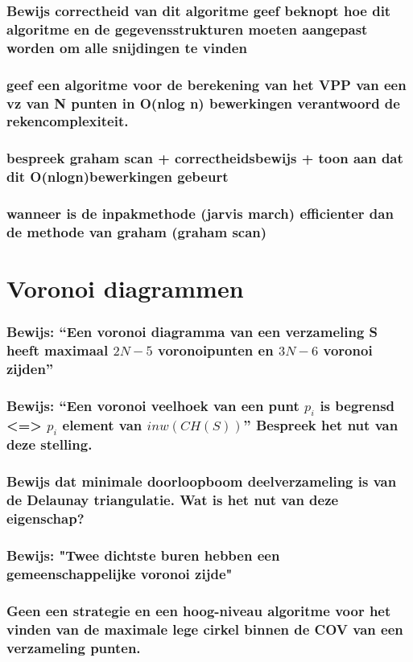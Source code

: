 \documentclass[12pt,a4paper]{article}
\begin{document}
\section{Bewijs correctheid van dit algoritme geef beknopt hoe dit algoritme en de gegevensstrukturen moeten aangepast worden om alle snijdingen te vinden}
\section{geef een algoritme voor de berekening van het VPP van een vz van N punten in O(nlog n) bewerkingen verantwoord de rekencomplexiteit.}
\section{bespreek graham scan + correctheidsbewijs + toon aan dat dit O(nlogn)bewerkingen gebeurt}
\section{wanneer is de inpakmethode (jarvis march) efficienter dan de methode van graham (graham scan)}
\fi

\part{Voronoi diagrammen}
\iffalse
\section{Bewijs: ``Een voronoi diagramma van een verzameling S heeft maximaal $2N - 5$ voronoipunten en $3N - 6$ voronoi zijden''}
\section{Bewijs: ``Een voronoi veelhoek van een punt $p_i$ is begrensd <=> $p_i$ element van $inw(CH(S))$'' Bespreek het nut van deze stelling.}
\section{Bewijs dat minimale doorloopboom deelverzameling is van de Delaunay triangulatie. Wat is het nut van deze eigenschap?}
\section{Bewijs: "Twee dichtste buren hebben een gemeenschappelijke voronoi zijde"}
\section{Geen een strategie en een hoog-niveau algoritme  voor het vinden van de maximale lege cirkel binnen de COV van een verzameling punten.}
\end{document}

